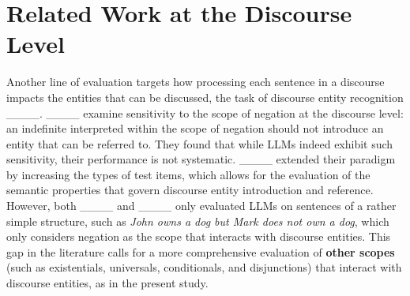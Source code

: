 \section{Related Work at the Discourse Level}

Another line of evaluation targets how processing each sentence in a discourse impacts the entities that can be discussed, the task of   discourse entity recognition ____. ____ examine sensitivity to the scope of negation at the discourse level: an indefinite interpreted within the scope of negation should not introduce an entity that can be referred to. They found that while LLMs indeed exhibit such sensitivity, their performance is not systematic. ____ extended their paradigm by increasing the types of test items, which allows for the evaluation of the semantic properties that govern discourse entity introduction and reference. 
However, both ____ and ____ only evaluated LLMs on sentences of a rather simple structure, such as \textit{John owns a dog but Mark does not own a dog}, which only considers negation as the scope that interacts with discourse entities. This gap in the literature calls for a more comprehensive evaluation of \textbf{other scopes} (such as existentials, universals, conditionals, and disjunctions) that interact with discourse entities, as in the present study.




